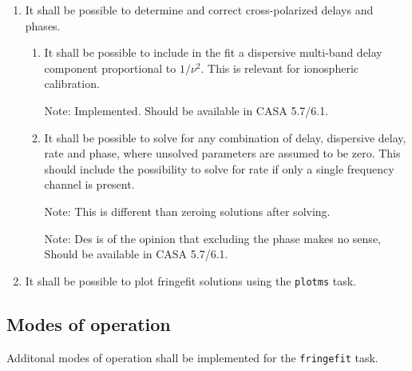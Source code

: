 \documentclass[11pt,a4paper]{article}
\begin{document}
\begin{enumerate}[subseclist]

\item It shall be possible to determine and correct cross-polarized
  delays and phases.

\begin{enumerate}[subsecsublist]

\item It shall be possible to include in the fit a dispersive
  multi-band delay component proportional to $1/\nu^2$. This is
  relevant for ionospheric calibration.

  Note: Implemented.  Should be available in CASA 5.7/6.1.

\item It shall be possible to solve for any combination of delay,
  dispersive delay, rate and phase, where unsolved parameters are
  assumed to be zero.  This should include the possibility to solve
  for rate if only a single frequency channel is present.

  Note: This is different than zeroing solutions after solving.
  
  Note: Des is of the opinion that excluding the phase makes no sense,
  Should be available in CASA 5.7/6.1.

\end{enumerate}

\item It shall be possible to plot fringefit solutions using the
  \texttt{plotms} task.

\end{enumerate}


\subsection{Modes of operation}

Additonal modes of operation shall be implemented for the
\texttt{fringefit} task.
\end{document}
